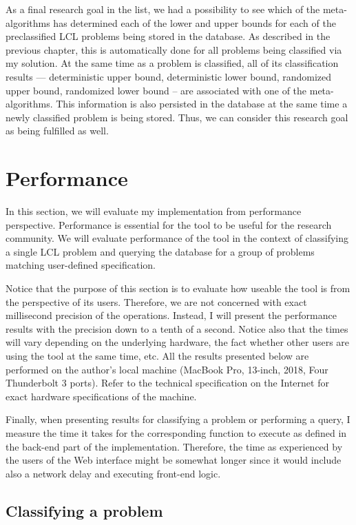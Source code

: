 As a final research goal in the list, we had a possibility
to see which of the meta-algorithms has determined each
of the lower and upper bounds for each of the preclassified
LCL problems being stored in the database. As described in the
previous chapter, this is automatically done for all problems being
classified via my solution. At the same time as a problem is classified,
all of its classification results --- deterministic upper bound,
deterministic lower bound, randomized upper bound, randomized lower bound --
are associated with one of the meta-algorithms. This information is also
persisted in the database at the same time a newly classified problem
is being stored. Thus, we can consider this research goal as being
fulfilled as well.

\section{Performance}

In this section, we will evaluate my implementation from
performance perspective. Performance is essential for
the tool to be useful for the research community.
We will evaluate performance of the tool
in the context of classifying a single LCL problem and
querying the database for a group
of problems matching user-defined specification.

Notice that the purpose of this section is to evaluate how
useable the tool is from the perspective of its users.
Therefore, we are not concerned with exact millisecond
precision of the operations. Instead, I will present
the performance results with the precision down to a tenth of a second.
Notice also that the times will vary depending on the underlying
hardware, the fact whether other users are using the tool at the same
time, etc. All the results presented below are performed on the
author's local machine (MacBook Pro, 13-inch, 2018, Four Thunderbolt 3 ports).
Refer to the technical specification on the Internet for exact
hardware specifications of the machine.

Finally, when presenting results for classifying a problem or
performing a query, I measure the time it takes
for the corresponding function to execute as defined in the back-end
part of the implementation. Therefore, the time as experienced by the users of
the Web interface might be somewhat longer since it would include
also a network delay and executing front-end logic.

\subsection{Classifying a problem}

